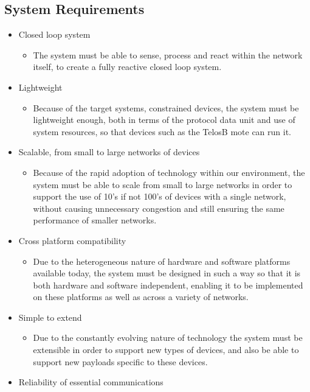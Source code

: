 \subsection{System Requirements} %
\label{sub:system_requirements}
\begin{itemize}
	\item Closed loop system
	\begin{itemize}
		\item The system must be able to sense, process and react within the network itself, to create a fully reactive closed loop system.
	\end{itemize}
	\item Lightweight
	\begin{itemize}
		\item Because of the target systems, constrained devices, the system must be lightweight enough, both in terms of the protocol data unit and use of system resources, so that devices such as the TelosB mote can run it.
	\end{itemize}
	\item Scalable, from small to large networks of devices
	\begin{itemize}
		\item Because of the rapid adoption of technology within our environment, the system must be able to scale from small to large networks in order to support the use of 10's if not 100's of devices with a single network, without causing unnecessary congestion and still ensuring the same performance of smaller networks.
	\end{itemize}
	\item Cross platform compatibility
	\begin{itemize}
		\item Due to the heterogeneous nature of hardware and software platforms available today, the system must be designed in such a way so that it is both hardware and software independent, enabling it to be implemented on these platforms as well as across a variety of networks.
	\end{itemize}
	\item Simple to extend
	\begin{itemize}
		\item Due to the constantly evolving nature of technology the system must be extensible in order to support new types of devices, and also be able to support new payloads specific to these devices.
	\end{itemize}
	\item Reliability of essential communications

\end{itemize}
